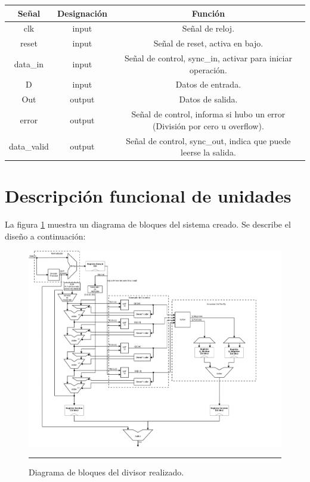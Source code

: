 \documentclass[12pt,a4paper]{article} %
\begin{document}
\begin{tabular}{c||c||c}
Señal & Designación & Función\\
\hline
\hline
clk & input & Señal de reloj. \\
reset & input & Señal de reset, activa en bajo. \\
data\_in & input & Señal de control, sync\_in, activar para iniciar operación. \\
D & input & Datos de entrada. \\
\hline
Out & output & Datos de salida. \\
error & output & Señal de control, informa si hubo un error (División por cero u overflow). \\
data\_valid & output & Señal de control, sync\_out, indica que puede leerse la salida. \\
\end{tabular}

\section{Descripción funcional de unidades}

La figura \ref{fig:Bloques} muestra un diagrama de bloques del sistema creado. Se describe el diseño a continuación:

\begin{figure}[htbp]
  \centering
    \includegraphics[scale=0.385, angle=270]{./img/Divisor.png}
    \rule{35em}{0.5pt}
  \caption[Bloques]{Diagrama de bloques del divisor realizado.}
  \label{fig:Bloques}
\end{figure}
\end{document}
